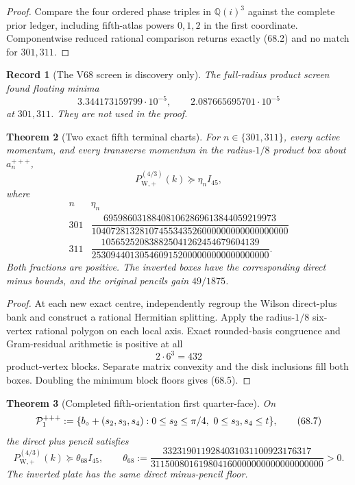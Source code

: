 \documentclass[11pt,oneside]{article}
\newtheorem{theorem}{Theorem}[section]
\newtheorem{record}[theorem]{Record}
\theoremstyle{definition}
\theoremstyle{remark}
\begin{document}
\begin{proof}
Compare the four ordered phase triples in \(\mathbb Q(i)^3\)
against the complete prior ledger, including fifth-atlas powers
\(0,1,2\) in the first coordinate.  Componentwise reduced rational
comparison returns exactly (68.2) and no match for \(301,311\).
\end{proof}

\begin{record}[The V68 screen is discovery only]
\label{rec:newv68-screen}
The full-radius product screen found floating minima
\[
 3.344173159799\cdot10^{-5},\qquad
 2.087665695701\cdot10^{-5}                           \tag{68.3}
\]
at \(301,311\).  They are not used in the proof.
\end{record}

\begin{theorem}[Two exact fifth terminal charts]
\label{thm:newv68-two-charts}
For \(n\in\{301,311\}\), every active momentum, and every transverse
momentum in the radius-\(1/8\) product box about
\(a_n^{+++}\),
\[
 P_{\mathrm W,+}^{(4/3)}(k)\succeq\eta_n I_{45},      \tag{68.4}
\]
where
\[
\begin{array}{c|c}
n&\eta_n\\ \hline
301&
\dfrac{695986031884081062869613844059219973}
 {10407281328107455343526000000000000000000}\\[6pt]
311&
\dfrac{105652520838825041262454679604139}
 {2530944013054609152000000000000000000}.
\end{array}                                           \tag{68.5}
\]
Both fractions are positive.  The inverted boxes have the
corresponding direct minus bounds, and the original pencils gain
\(49/1875\).
\end{theorem}

\begin{proof}
At each new exact centre, independently regroup the Wilson
direct-plus bank and construct a rational Hermitian splitting.
Apply the radius-\(1/8\) six-vertex rational polygon on each local
axis.  Exact rounded-basis congruence and Gram-residual arithmetic
is positive at all
\[
 2\cdot6^3=432                                        \tag{68.6}
\]
product-vertex blocks.  Separate matrix convexity and the disk
inclusions fill both boxes.  Doubling the minimum block floors gives
(68.5).
\end{proof}

\begin{theorem}[Completed fifth-orientation first quarter-face]
\label{thm:newv68-first-plate}
On
\[
 {\cal P}^{+++}_1:=
 \{b_\circ+(s_2,s_3,s_4):
       0\le s_2\le\pi/4,\ 0\le s_3,s_4\le t\},        \tag{68.7}
\]
the direct plus pencil satisfies
\[
 P_{\mathrm W,+}^{(4/3)}(k)
 \succeq\theta_{68}I_{45},\qquad
 \theta_{68}:=
 \frac{3323190119284031031100923176317}
 {311500801619804160000000000000000000}>0.           \tag{68.8}
\]
The inverted plate has the same direct minus-pencil floor.
\end{theorem}
\end{document}
